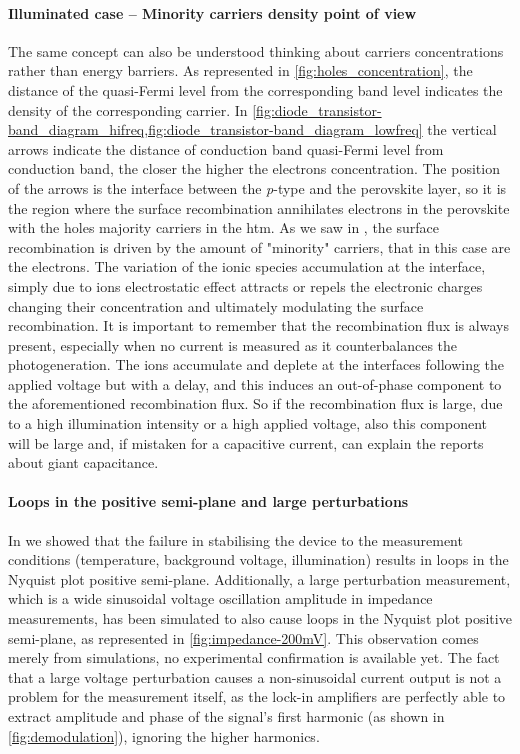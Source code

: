 		\paragraph{Illuminated case -- Minority carriers density point of view}
		The same concept can also be understood thinking about carriers concentrations rather than energy barriers.
		As represented in \cref{fig:holes_concentration}, the distance of the quasi\hyp{}Fermi level from the corresponding band level indicates the density of the corresponding carrier.
		In \cref{fig:diode_transistor-band_diagram_hifreq,fig:diode_transistor-band_diagram_lowfreq} the vertical arrows indicate the distance of conduction band quasi\hyp{}Fermi level from conduction band, the closer the higher the electrons concentration.
		The position of the arrows is the interface between the \textit{p}-type and the perovskite layer, so it is the region where the surface recombination annihilates electrons in the perovskite with the holes majority carriers in the \gls{htm}.
		As we saw in , the surface recombination is driven by the amount of "minority" carriers, that in this case are the electrons.
		The variation of the ionic species accumulation at the interface, simply due to ions electrostatic effect attracts or repels the electronic charges changing their concentration and ultimately modulating the surface recombination.
		It is important to remember that the recombination flux is always present, especially when no current is measured as it counterbalances the photogeneration.
		The ions accumulate and deplete at the interfaces following the applied voltage but with a delay, and this induces an out\hyp{}of\hyp{}phase component to the aforementioned recombination flux.
		So if the recombination flux is large, due to a high illumination intensity or a high applied voltage, also this component will be large and, if mistaken for a capacitive current, can explain the reports about giant capacitance.




		\paragraph{Loops in the positive semi-plane and large perturbations}\label{impedance-large_perturbations}
		In  we showed that the failure in stabilising the device to the measurement conditions (temperature, background voltage, illumination) results in loops in the Nyquist plot positive semi\hyp{}plane.
		Additionally, a large perturbation measurement, which is a wide sinusoidal voltage oscillation amplitude in impedance measurements, has been simulated to also cause loops in the Nyquist plot positive semi\hyp{}plane, as represented in \cref{fig:impedance-200mV}.
		This observation comes merely from simulations, no experimental confirmation is available yet.
		The fact that a large voltage perturbation causes a non\hyp{}sinusoidal current output is not a problem for the measurement itself, as the lock-in amplifiers are perfectly able to extract amplitude and phase of the signal's first harmonic (as shown in \cref{fig:demodulation}), ignoring the higher harmonics.

